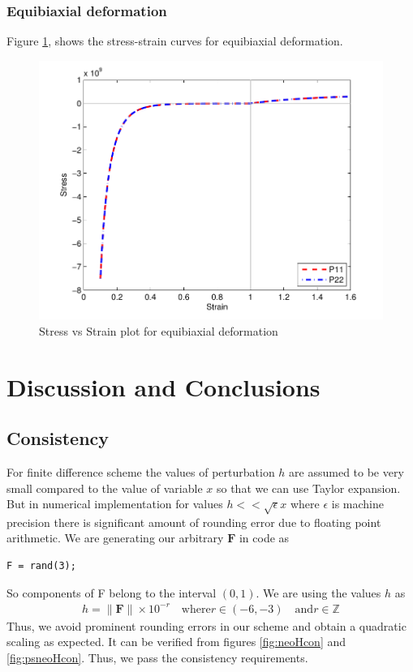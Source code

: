 \documentclass[../main.tex]{subfiles}
\begin{document}
\subsubsection{Equibiaxial deformation}
Figure \ref{fig:equibiaxial}, shows the stress-strain curves for equibiaxial deformation.
\begin{figure}[h]
  \centering
  \includegraphics{./img/EquiBiaxial_1.pdf}  
  \caption{Stress vs Strain plot for equibiaxial deformation}
  \label{fig:equibiaxial}
\end{figure}


\section{Discussion and Conclusions}
\subsection{Consistency}
For finite difference scheme the values of perturbation $h$ are assumed to be very small compared to the value of variable $x$ so that we can use Taylor expansion. But in numerical implementation for values $h << \sqrt{\epsilon}x$ where $\epsilon$ is machine precision there is significant amount of rounding error due to floating point arithmetic. We are generating our arbitrary $\mathbf{F}$ in code as 
\begin{lstlisting}[frame=single]
  F = rand(3);
\end{lstlisting}
So components of F belong to the interval $(0,1)$. We are using the values $h$ as 
\begin{align*}
   h = \lVert\mathbf{F}\rVert\times10^{-r}\quad\text{where} r\in(-6,-3)\quad \text{and} r\in\mathbb{Z}
\end{align*}
Thus, we avoid prominent rounding errors in our scheme and obtain a quadratic scaling as expected. It can be verified from figures \ref{fig:neoHcon} and \ref{fig:psneoHcon}. Thus, we pass the consistency requirements.
\end{document}
